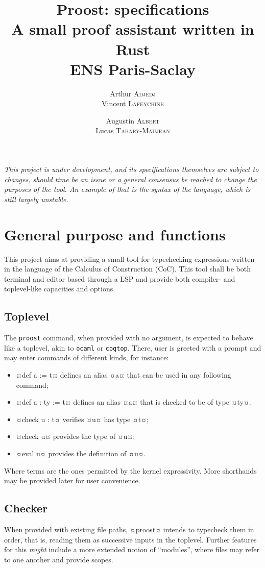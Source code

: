 \documentclass[twocolumn]{article}
\author{
  Arthur \textsc{Adjedj}\\
  Vincent \textsc{Lafeychine} \and
  Augustin \textsc{Albert} \\
  Lucas \textsc{Tabary-Maujean}
}
\title{\textbf{Proost: specifications}\\
  \large A small proof assistant written in Rust
  \\[1\baselineskip]\normalsize ENS Paris-Saclay
}
\begin{document}
\thispagestyle{fancy}
\maketitle

\emph{
  This project is under development, and its specifications themselves are
  subject to changes, should time be an issue or a general consensus be reached
  to change the purposes of the tool. An example of that is the syntax of
  the language, which is still largely unstable.
}

\section{General purpose and functions}
This project aims at providing a small tool for typechecking expressions written in
the language of the Calculus of Construction (CoC). This tool shall be
both terminal and editor based through a LSP and provide both compiler- and toplevel-like capacities and
options.

\subsection{Toplevel}
The \texttt{proost} command, when provided with no argument, is expected to behave like
a toplevel, akin to \texttt{ocaml} or \texttt{coqtop}. There, user is greeted with a
prompt and may enter commands of different kinds, for instance:
\begin{itemize}
  \item ¤def a := t¤ defines an alias ¤a¤ that can be used in any following command;
  \item ¤def a : ty := t¤ defines an alias ¤a¤ that is checked to be of type ¤ty¤.
  \item ¤check u : t¤ verifies ¤u¤ has type ¤t¤;
  \item ¤check u¤ provides the type of ¤u¤;
  \item ¤eval u¤ provides the definition of ¤u¤.
\end{itemize}

Where terms are the ones permitted by the kernel expressivity.
More shorthands may be provided later for user convenience.

\subsection{Checker}
When provided with existing file paths, ¤proost¤ intends to typecheck them in
order, that is, reading them as successive inputs in the toplevel. Further
features for this \emph{might} include a more extended notion of ``modules'', where files
may refer to one another and provide scopes.
\end{document}
